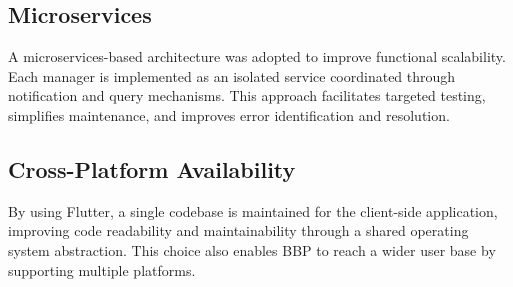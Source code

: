 \subsection{Microservices}
A microservices-based architecture was adopted to improve functional scalability. Each manager is implemented as an isolated service coordinated through notification and query mechanisms. This approach facilitates targeted testing, simplifies maintenance, and improves error identification and resolution.

\subsection{Cross-Platform Availability}
By using Flutter, a single codebase is maintained for the client-side application, improving code readability and maintainability through a shared operating system abstraction. This choice also enables BBP to reach a wider user base by supporting multiple platforms.